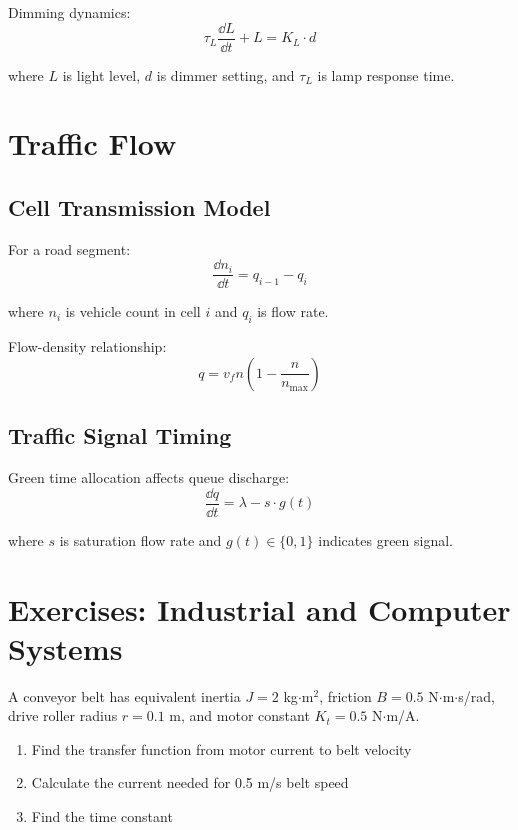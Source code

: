 Dimming dynamics:
\begin{equation}
\tau_L\frac{\dd L}{\dd t} + L = K_L \cdot d
\end{equation}

where $L$ is light level, $d$ is dimmer setting, and $\tau_L$ is lamp response time.

\section{Traffic Flow}
\label{sec:traffic}

\subsection{Cell Transmission Model}

For a road segment:
\begin{equation}
\frac{\dd n_i}{\dd t} = q_{i-1} - q_i
\end{equation}

where $n_i$ is vehicle count in cell $i$ and $q_i$ is flow rate.

Flow-density relationship:
\begin{equation}
q = v_f n \left(1 - \frac{n}{n_{\max}}\right)
\end{equation}

\subsection{Traffic Signal Timing}

Green time allocation affects queue discharge:
\begin{equation}
\frac{\dd q}{\dd t} = \lambda - s \cdot g(t)
\end{equation}

where $s$ is saturation flow rate and $g(t) \in \{0, 1\}$ indicates green signal.

\section{Exercises: Industrial and Computer Systems}

\begin{exercise}
A conveyor belt has equivalent inertia $J = 2$ kg$\cdot$m$^2$, friction $B = 0.5$ N$\cdot$m$\cdot$s/rad, drive roller radius $r = 0.1$ m, and motor constant $K_t = 0.5$ N$\cdot$m/A.
\begin{enumerate}[label=(\alph*)]
    \item Find the transfer function from motor current to belt velocity
    \item Calculate the current needed for 0.5 m/s belt speed
    \item Find the time constant
\end{enumerate}
\end{exercise}

